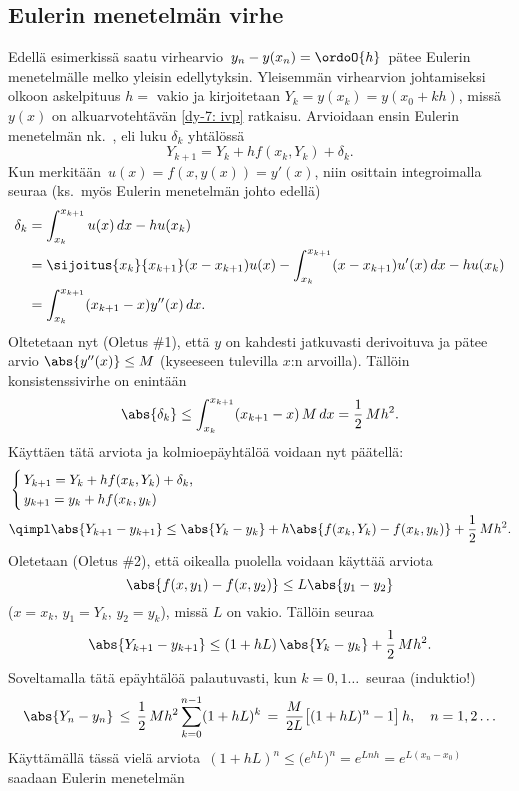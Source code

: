\subsection*{Eulerin menetelmän virhe}

Edellä esimerkissä saatu virhearvio $\,y_n-y(x_n)=\ordoO{h}\,$ pätee Eulerin menetelmälle melko
yleisin edellytyksin. Yleisemmän virhearvion johtamiseksi olkoon askelpituus $h=$ vakio ja 
kirjoitetaan $Y_k=y(x_k)=y(x_0+kh)$, missä $y(x)$ on alkuarvotehtävän \eqref{dy-7: ivp} 
%
ratkaisu. Arvioidaan ensin Eulerin menetelmän nk.\ , eli luku $\delta_k$
yhtälössä
\[
Y_{k+1}=Y_k+hf(x_k,Y_k)+\delta_k.
\]
Kun merkitään $\,u(x)=f(x,y(x))=y'(x)$, niin osittain integroimalla seuraa (ks.\ myös Eulerin
menetelmän johto edellä)
\begin{align*}
\delta_k &= \int_{x_k}^{x_{k+1}} u(x)\,dx - hu(x_k) \\
         &=\sijoitus{x_k}{x_{k+1}} (x-x_{k+1})u(x) - \int_{x_k}^{x_{k+1}} (x-x_{k+1})u'(x)\,dx
                                                   - hu(x_k) \\
         &= \int_{x_k}^{x_{k+1}} (x_{k+1}-x)y''(x)\,dx.
\end{align*}
Oltetetaan nyt (Oletus \#1), että $y$ on kahdesti jatkuvasti derivoituva ja pätee arvio
$\abs{y''(x)} \le M$ (kyseeseen tulevilla $x$:n arvoilla). Tällöin konsistenssivirhe on enintään
\[
\abs{\delta_k} \le \int_{x_k}^{x_{k+1}} (x_{k+1}-x)\,M\,dx = \frac{1}{2}\,Mh^2.
\]
Käyttäen tätä arviota ja kolmioepäyhtälöä voidaan nyt päätellä:
\begin{align*}
&\begin{cases} 
\, Y_{k+1}=Y_k+hf(x_k,Y_k)+\delta_k, \\ \,y_{k+1}=y_k+hf(x_k,y_k)
 \end{cases} \\
&\qimpl \abs{Y_{k+1}-y_{k+1}} \le \abs{Y_k-y_k}+h\abs{f(x_k,Y_k)-f(x_k,y_k)}+\frac{1}{2}\,Mh^2.
\end{align*}
Oletetaan (Oletus \#2), että oikealla puolella voidaan käyttää arviota
\[
\abs{f(x,y_1)-f(x,y_2)} \le L\abs{y_1-y_2}
\]
($x=x_k,\,y_1=Y_k,\,y_2=y_k$), missä $L$ on vakio. Tällöin seuraa
\[
\abs{Y_{k+1}-y_{k+1}} \le (1+hL)\,\abs{Y_k-y_k} + \frac{1}{2}\,Mh^2.
\]
Soveltamalla tätä epäyhtälöä palautuvasti, kun $k=0,1 \ldots\,$ seuraa (induktio!)
\[
\abs{Y_n-y_n}\,\le\,\frac{1}{2}\,Mh^2 \sum_{k=0}^{n-1} (1+hL)^k\,
                 =\,\frac{M}{2L}\bigl[(1+hL)^n-1\bigr]\,h, \quad n=1,2 \ldots
\]
Käyttämällä tässä vielä arviota 
$\,(1+hL)^n \le \bigl(e^{hL}\bigr)^n = e^{Lnh} = e^{L(x_n-x_0)}\,$ saadaan Eulerin menetelmän 
